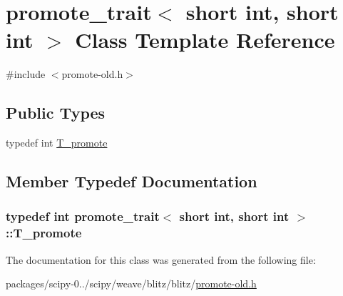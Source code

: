 \hypertarget{classpromote__trait_3_01short_01int_00_01short_01int_01_4}{}\section{promote\+\_\+trait$<$ short int, short int $>$ Class Template Reference}
\label{classpromote__trait_3_01short_01int_00_01short_01int_01_4}


{\ttfamily \#include $<$promote-\/old.\+h$>$}

\subsection*{Public Types}
\begin{DoxyCompactItemize}
\item 
typedef int \hyperlink{classpromote__trait_3_01short_01int_00_01short_01int_01_4_a3ec3161557950c31d5b338cec2fd726a}{T\+\_\+promote}
\end{DoxyCompactItemize}


\subsection{Member Typedef Documentation}
\hypertarget{classpromote__trait_3_01short_01int_00_01short_01int_01_4_a3ec3161557950c31d5b338cec2fd726a}{}
\subsubsection[{T\+\_\+promote}]{\setlength{\rightskip}{0pt plus 5cm}typedef int {\bf promote\+\_\+trait}$<$ short int, short int $>$\+::{\bf T\+\_\+promote}}\label{classpromote__trait_3_01short_01int_00_01short_01int_01_4_a3ec3161557950c31d5b338cec2fd726a}


The documentation for this class was generated from the following file\+:\begin{DoxyCompactItemize}
\item 
packages/scipy-\/0../scipy/weave/blitz/blitz/\hyperlink{promote-old_8h}{promote-\/old.\+h}\end{DoxyCompactItemize}
